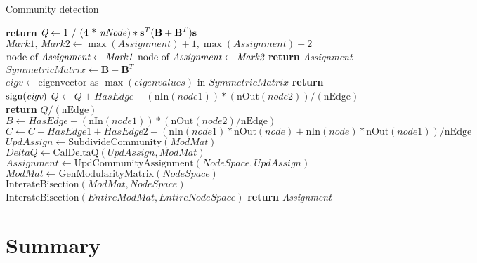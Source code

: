 \begin{algorithm}[H]
	\caption{Community detection}\label{alg:communitydetection}
	\begin{algorithmic}[1]
		\State \textbf{return} \emph{$\textit{Q} \gets \text{1 / (4 * \textit{nNode})} * \textbf{s}^T(\textbf{B}+\textbf{B}^T)\textbf{s}$}
		\EndProcedure
		\State $\textit{Mark1, Mark2} \gets \max( \textit{Assignment})+1, \max( \textit{Assignment})+2$
		 {$\text{node of } \textit{Assignment} \gets \emph{Mark1}$}
		\EndIf
		 {$\text{node of } \textit{Assignment} \gets \emph{Mark2}$}
		\EndIf
		\EndFor
		\State \textbf{return} \emph{Assignment}
		\EndProcedure
		\State $\textit{SymmetricMatrix} \gets  \textbf{B}+\textbf{B}^T$
		\State $\textit{eigv} \gets \text{eigenvector as }\max(eigenvalues) \text{ in } \textit{SymmetricMatrix}$
		\State \textbf{return} $\operatorname{sign}(\textit{eigv})$
		\EndProcedure
		\State $Q \gets Q + HasEdge - (\text{nIn}( \textit{node1}))*(\text{nOut}(\textit{node2}))/ (\text{nEdge})$
		\EndIf
		\EndFor
		\EndFor
		\State \textbf{return} \emph{$Q / (\text{nEdge})$}
		\EndProcedure
		\State $\textit{B} \gets \textit{HasEdge} - (\text{nIn}( \textit{node1}))*(\text{nOut}( \textit{node2})/\text{nEdge})$
		 {$C \gets C+\textit{HasEdge1}+\textit{HasEdge2}-(\text{nIn} (\textit{node1})*\text{nOut}(\textit{node})+\text{nIn}( \textit{node})*\text{nOut}(\textit{node1}))/\text{nEdge}$}
		\EndFor
		\EndIf
		\EndFor
		\EndFor
		\EndProcedure
		\State $\textit{UpdAssign} \gets \text{SubdivideCommunity}(ModMat)$
		\State $\textit{DeltaQ} \gets \text{CalDeltaQ}(\textit{UpdAssign}, \textit{ModMat})$
		\State $\textit{Assignment} \gets \text{UpdCommunityAssignment}(\textit{NodeSpace}, \textit{UpdAssign})$
		\State $\textit{ModMat} \gets \text{GenModularityMatrix}(\textit{NodeSpace})$
		\State $\text{InterateBisection}(ModMat, NodeSpace)$
		\EndFor
		\EndIf 
		\EndProcedure
		\State $\text{InterateBisection}(EntireModMat, EntireNodeSpace)$
		\State \textbf{return} \emph{Assignment}
		\EndProcedure
	\end{algorithmic}
\end{algorithm}
\section{Summary}
